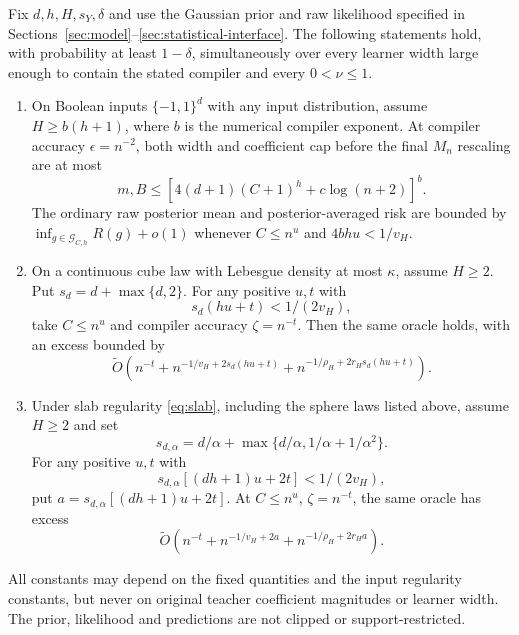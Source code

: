 \begin{theorem}
\label{thm:width-only}
Fix $d,h,H,s_Y,\delta$ and use the Gaussian prior and raw likelihood
specified in Sections~\ref{sec:model}--\ref{sec:statistical-interface}.
The following statements hold, with probability at least $1-\delta$,
simultaneously over every learner width large enough to contain the
stated compiler and every $0<\nu\le1$.

\begin{enumerate}
\item On Boolean inputs $\{-1,1\}^d$ with any input distribution, assume
$H\ge b(h+1)$, where $b$ is the numerical compiler exponent.
At compiler accuracy $\epsilon=n^{-2}$, both width and coefficient
cap before the final $M_n$ rescaling are at most
\[
 m,B\le[4(d+1)(C+1)^h+c\log(n+2)]^b.
\]
The ordinary raw posterior mean and posterior-averaged risk are bounded
by $\inf_{g\in\mathcal G_{C,h}}R(g)+o(1)$ whenever
$C\le n^u$ and $4bhu<1/v_H$.

\item On a continuous cube law with Lebesgue density at most $\kappa$,
assume $H\ge2$. Put $s_d=d+\max\{d,2\}$. For any positive $u,t$ with
\begin{equation}
 s_d(hu+t)<1/(2v_H),
 \label{eq:density-growth}
\end{equation}
take $C\le n^u$ and compiler accuracy $\zeta=n^{-t}$.
Then the same oracle holds, with an excess bounded by
\[
 \widetilde O\left(n^{-t}
       +n^{-1/v_H+2s_d(hu+t)}
       +n^{-1/\rho_H+2r_Hs_d(hu+t)}\right).
\]

\item Under slab regularity \eqref{eq:slab}, including the sphere laws
listed above, assume $H\ge2$ and set
\[
 s_{d,\alpha}=d/\alpha+
             \max\{d/\alpha,1/\alpha+1/\alpha^2\}.
\]
For any positive $u,t$ with
\begin{equation}
 s_{d,\alpha}[(dh+1)u+2t]<1/(2v_H),
 \label{eq:slab-growth}
\end{equation}
put $a=s_{d,\alpha}[(dh+1)u+2t]$.
At $C\le n^u$, $\zeta=n^{-t}$, the same oracle has excess
\[
 \widetilde O\left(n^{-t}+n^{-1/v_H+2a}
                              +n^{-1/\rho_H+2r_Ha}\right).
\]
\end{enumerate}
All constants may depend on the fixed quantities and the input
regularity constants, but never on original teacher coefficient
magnitudes or learner width. The prior, likelihood and predictions
are not clipped or support-restricted.
\end{theorem}
